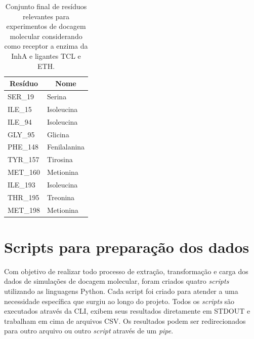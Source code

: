 \begin{table}[h]
\caption{Conjunto final de resíduos relevantes para experimentos de docagem molecular considerando como receptor a enzima da InhA e ligantes TCL e ETH.}
\label{tab:listaProvavelRelevantes}
\centering
\begin{tabular}{@{}ll@{}}
\toprule
\multicolumn{1}{c}{Resíduo} & \multicolumn{1}{c}{Nome} \\ \midrule
SER\_19                     & Serina                   \\
ILE\_15                     & Isoleucina               \\
ILE\_94                     & Isoleucina               \\
GLY\_95                     & Glicina                  \\
PHE\_148                    & Fenilalanina             \\
TYR\_157                    & Tirosina                 \\
MET\_160                    & Metionina                \\
ILE\_193                    & Isoleucina               \\
THR\_195                    & Treonina                 \\
MET\_198                    & Metionina                \\ \bottomrule
\end{tabular}
\end{table}

\section{Scripts para preparação dos dados}
\label{sec:ScriptsParaPreparacaoDosDados}

Com objetivo de realizar todo processo de extração, transformação e carga dos dados de simulações de docagem molecular, foram criados quatro \emph{scripts} utilizando as linguagens Python. Cada script foi criado para atender a uma necessidade específica que surgiu ao longo do projeto. Todos os \emph{scripts} são executados através da CLI, exibem seus resultados diretamente em STDOUT e trabalham em cima de arquivos CSV. Os resultados podem ser redirecionados para outro arquivo ou outro \emph{script} através de um \emph{pipe}.


